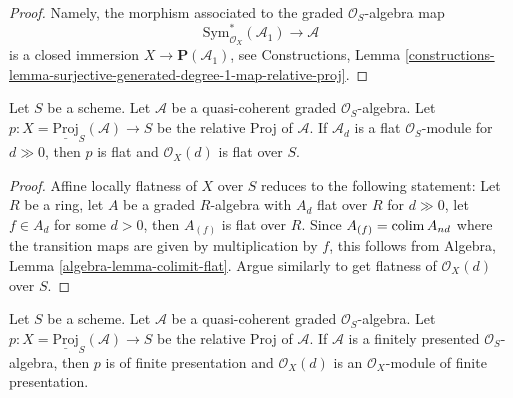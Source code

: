 \begin{proof}
Namely, the morphism associated to the graded $\mathcal{O}_S$-algebra map
$$
\text{Sym}_{\mathcal{O}_X}^*(\mathcal{A}_1)
\longrightarrow
\mathcal{A}
$$
is a closed immersion $X \to \mathbf{P}(\mathcal{A}_1)$, see
Constructions, Lemma
\ref{constructions-lemma-surjective-generated-degree-1-map-relative-proj}.
\end{proof}

\begin{lemma}
\label{lemma-relative-proj-flat}
Let $S$ be a scheme. Let $\mathcal{A}$ be a quasi-coherent graded
$\mathcal{O}_S$-algebra. Let
$p : X = \underline{\text{Proj}}_S(\mathcal{A}) \to S$ be the relative
Proj of $\mathcal{A}$. If $\mathcal{A}_d$ is a flat $\mathcal{O}_S$-module
for $d \gg 0$, then $p$ is flat and $\mathcal{O}_X(d)$ is
flat over $S$.
\end{lemma}

\begin{proof}
Affine locally flatness of $X$ over $S$ reduces to the following statement:
Let $R$ be a ring, let $A$ be a graded $R$-algebra with
$A_d$ flat over $R$ for $d \gg 0$, let $f \in A_d$
for some $d > 0$, then $A_{(f)}$ is flat over $R$.
Since $A_{(f)} = \mathop{\mathrm{colim}}\nolimits A_{nd}$ where the transition maps
are given by multiplication by $f$, this follows from
Algebra, Lemma \ref{algebra-lemma-colimit-flat}.
Argue similarly to get flatness of $\mathcal{O}_X(d)$ over $S$.
\end{proof}

\begin{lemma}
\label{lemma-relative-proj-finite-presentation}
Let $S$ be a scheme. Let $\mathcal{A}$ be a quasi-coherent graded
$\mathcal{O}_S$-algebra. Let
$p : X = \underline{\text{Proj}}_S(\mathcal{A}) \to S$ be the relative
Proj of $\mathcal{A}$. If $\mathcal{A}$ is a finitely presented
$\mathcal{O}_S$-algebra, then $p$ is of finite presentation
and $\mathcal{O}_X(d)$ is an $\mathcal{O}_X$-module of finite presentation.
\end{lemma}

